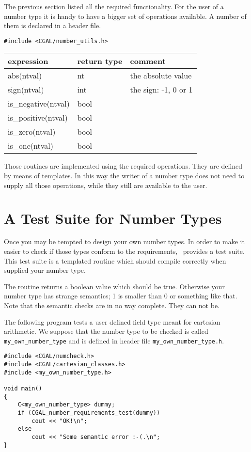 \documentclass[]{article}
\begin{document}
\label{sec_number_utilities}

The previous section listed all the required functionality.
For the user of a number type it is handy to have a bigger set of
operations available.
A number of them is declared in a header file.
\begin{verbatim}
#include <CGAL/number_utils.h>
\end{verbatim}


\begin{tabular}[h]{|l|l|l|}
\hline
expression      & return type  & comment \\
\hline
abs(ntval)          & nt   & the absolute value \\
sign(ntval)         & int  & the sign: -1, 0 or 1 \\
is\_negative(ntval) & bool & \\
is\_positive(ntval) & bool & \\
is\_zero(ntval)     & bool & \\
is\_one(ntval)     & bool & \\
\hline
\end{tabular}

Those routines are implemented using the required operations.
They are defined by means of templates.
In this way the writer of a number type does not need to supply all those
operations, while they still are available to the user.


\section{A Test Suite for Number Types}

Once you may be tempted to design your own number types. In order to make it
easier to check if those types conform to the requirements, \cgal\ provides a
test suite. This test suite is a templated routine which should compile
correctly when supplied your number type.

The routine returns a boolean value which should be true.
Otherwise your number type has strange semantics; 1 is smaller than 0 or
something like that.
Note that the semantic checks are in no way complete. They can not be.

The following program tests a user defined field type meant for cartesian
arithmetic. We suppose that the number type to be checked is called
\verb~my_own_number_type~ and is defined in header file
\verb~my_own_number_type.h~.
\begin{verbatim}
#include <CGAL/numcheck.h>
#include <CGAL/cartesian_classes.h>
#include <my_own_number_type.h>

void main()
{
    C<my_own_number_type> dummy;
    if (CGAL_number_requirements_test(dummy))
        cout << "OK!\n";
    else
        cout << "Some semantic error :-(.\n";
}
\end{verbatim}
\end{document}

